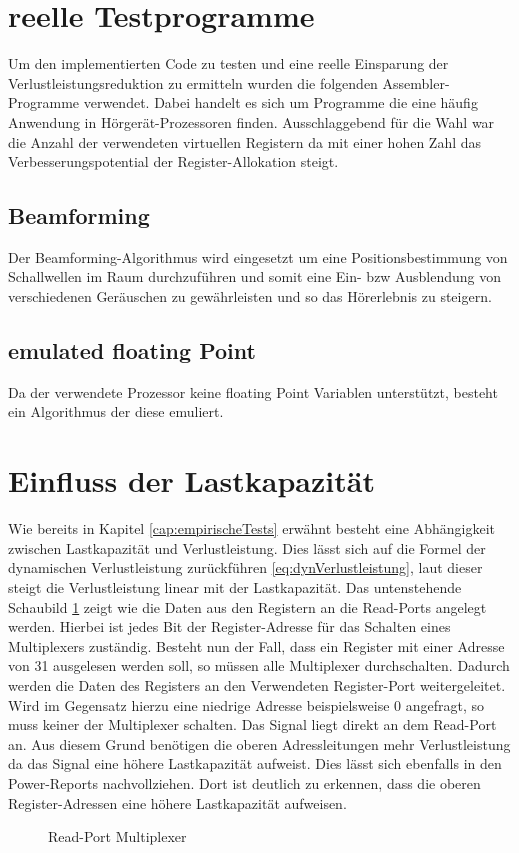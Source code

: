 \section{reelle Testprogramme}
\label{sec:testprogamme}
Um den implementierten Code zu testen und eine reelle Einsparung der Verlustleistungsreduktion zu ermitteln wurden die folgenden Assembler-Programme verwendet. Dabei handelt es sich um Programme die eine häufig Anwendung in Hörgerät-Prozessoren finden. Ausschlaggebend für die Wahl war die Anzahl der verwendeten virtuellen Registern da mit einer hohen Zahl das Verbesserungspotential der Register-Allokation steigt.
\subsection{Beamforming}
Der Beamforming-Algorithmus wird eingesetzt um eine Positionsbestimmung von Schallwellen im Raum durchzuführen und somit eine Ein- bzw Ausblendung von verschiedenen Geräuschen zu gewährleisten und so das Hörerlebnis zu steigern. 

\subsection{emulated floating Point}
Da der verwendete Prozessor keine floating Point Variablen unterstützt, besteht ein Algorithmus der diese emuliert. 




\section{Einfluss der Lastkapazität}
 \label{cap:lastkapa}
Wie bereits in Kapitel \ref{cap:empirischeTests} erwähnt besteht eine Abhängigkeit zwischen Lastkapazität und Verlustleistung. Dies lässt sich auf die Formel der dynamischen Verlustleistung zurückführen \ref{eq:dynVerlustleistung}, laut dieser steigt die Verlustleistung linear mit der Lastkapazität.
Das untenstehende Schaubild \ref{fig:read_port_mux} zeigt wie die Daten aus den Registern an die Read-Ports angelegt werden. Hierbei ist jedes Bit der Register-Adresse für das Schalten eines Multiplexers zuständig. Besteht nun der Fall, dass ein Register mit einer Adresse von 31 ausgelesen werden soll, so müssen alle Multiplexer durchschalten. Dadurch werden die Daten des Registers an den Verwendeten Register-Port weitergeleitet. Wird im Gegensatz hierzu eine niedrige Adresse beispielsweise 0 angefragt, so muss keiner der Multiplexer schalten. Das Signal liegt direkt an dem Read-Port an. Aus diesem Grund benötigen die oberen Adressleitungen mehr Verlustleistung da das Signal eine höhere Lastkapazität aufweist. Dies lässt sich ebenfalls in den Power-Reports nachvollziehen. Dort ist deutlich zu erkennen, dass die oberen Register-Adressen eine höhere Lastkapazität aufweisen. 
\begin{scriptsize}
	\begin{figure}[htbp] 
		\centering
		
		\caption{Read-Port Multiplexer}
		\label{fig:read_port_mux}
	\end{figure}
\end{scriptsize}

